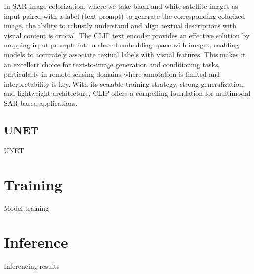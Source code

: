 In SAR image colorization, where we take black-and-white satellite images as input paired with a label (text prompt) to generate the corresponding colorized image, the ability to robustly understand and align textual descriptions with visual content is crucial. The CLIP text encoder provides an effective solution by mapping input prompts into a shared embedding space with images, enabling models to accurately associate textual labels with visual features. This makes it an excellent choice for text-to-image generation and conditioning tasks, particularly in remote sensing domains where annotation is limited and interpretability is key. With its scalable training strategy, strong generalization, and lightweight architecture, CLIP offers a compelling foundation for multimodal SAR-based applications.



\subsection{UNET}

UNET

\section{Training}

Model training

\section{Inference}

Inferencing results
